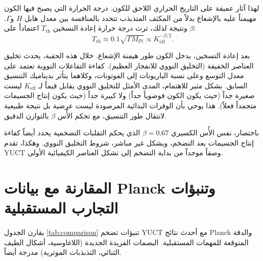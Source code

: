 \documentclass[12pt,a4paper]{article}
\newcommand{\Keff}{K_{\mathrm{eff}}}
\begin{document}
	لهذا آثار عميقة على التاريخ الحراري اللاحق للكون. درجة الحرارة التي يصبح فيها الكون مهيمناً عليه بالإشعاع بدلاً من المكثف المتذبذب تتحدد بالمنافسة بين معدل هابل \(H\) و\(\Gamma\). ونتيجة لذلك، ترث درجة حرارة إعادة التسخين \(T_{\mathrm{rh}}\) اعتماداً على \(\beta\):
	\begin{equation}
		T_{\mathrm{rh}} \approx 0.1 \sqrt{\Gamma M_{\mathrm{Pl}}} \propto \Keff^{-\beta/2}.
		\label{eq:trh}
	\end{equation}
	
	بعد إعادة التسخين، يدخل الكون طور هيمنة الإشعاع. خلال هذه الحقبة، يحدث تخليق العناصر الخفيفة (التخليق النووي للانفجار العظيم). كفاءة التفاعلات النووية تعتمد على معدل التوسع وعلى نسبة الباريونات إلى الفوتونات، وكلاهما يتأثر بديناميك التنسيق السابق. بشكل مثير للاهتمام، المدى الأمثل للتخليق النووي يقابل قيماً لـ \(\Keff\) ليست صغيرة جداً (حيث يكون الكون فوضوياً جداً) ولا كبيرة جداً (حيث يكون إنتاج الجسيمات متجمداً فعلاً). هذا يوحي بأن الوفرات البدائية المرصودة ليست عرضية بل نتيجة طبيعية لانتقال طور التنسيق، مع تحكم الأُس \(\beta\) بالتوازن الدقيق.
	
	باختصار، نفس الأُس الكسيري \(\beta = 0.67\) الذي يحكم التقلبات التضخمية يحدد أيضاً كفاءة إنتاج الجسيمات بعد التضخم، وبشكل غير مباشر، شروط التخليق النووي. وهكذا، تقدم YUCT وصفاً موحداً من بداية التضخم إلى تشكل العناصر الكيميائية الأولى.
	
	\section{المقارنة مع بيانات Planck وتنبؤات التجارب المستقبلية}
	\label{sec:comparison}
	
	يقارن الجدول \ref{tab:comparison} تنبؤات تضخم YUCT مع أحدث نتائج Planck والدقة المتوقعة للمهمات المستقبلية. البصمات الفريدة الجديدة (اللاغاوسية، أشكال الطيف الثنائي، التذبذبات الموترية) مدرجة أيضاً.
	
\end{document}
